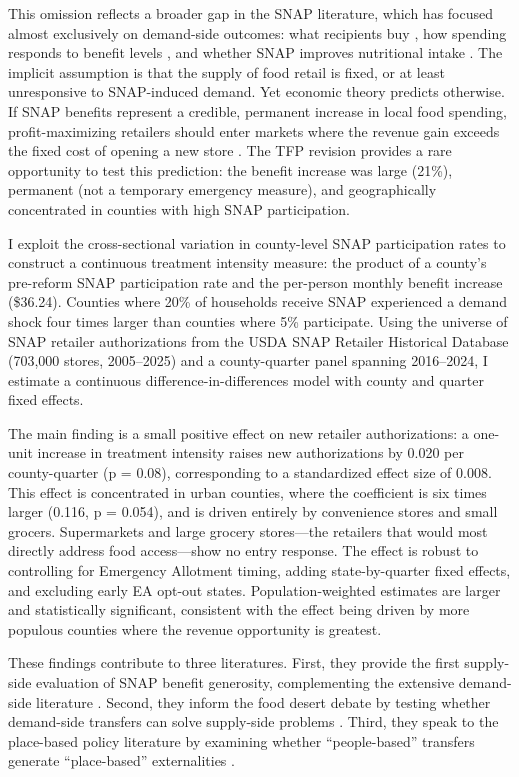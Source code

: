\documentclass[12pt]{article}
\begin{document}
This omission reflects a broader gap in the SNAP literature, which has focused almost exclusively on demand-side outcomes: what recipients buy \citep{hastings2019}, how spending responds to benefit levels \citep{east2023}, and whether SNAP improves nutritional intake \citep{hoynes2016}. The implicit assumption is that the supply of food retail is fixed, or at least unresponsive to SNAP-induced demand. Yet economic theory predicts otherwise. If SNAP benefits represent a credible, permanent increase in local food spending, profit-maximizing retailers should enter markets where the revenue gain exceeds the fixed cost of opening a new store \citep{allcott2019}. The TFP revision provides a rare opportunity to test this prediction: the benefit increase was large (21\%), permanent (not a temporary emergency measure), and geographically concentrated in counties with high SNAP participation.

I exploit the cross-sectional variation in county-level SNAP participation rates to construct a continuous treatment intensity measure: the product of a county's pre-reform SNAP participation rate and the per-person monthly benefit increase (\$36.24). Counties where 20\% of households receive SNAP experienced a demand shock four times larger than counties where 5\% participate. Using the universe of SNAP retailer authorizations from the USDA SNAP Retailer Historical Database (703,000 stores, 2005--2025) and a county-quarter panel spanning 2016--2024, I estimate a continuous difference-in-differences model with county and quarter fixed effects.

The main finding is a small positive effect on new retailer authorizations: a one-unit increase in treatment intensity raises new authorizations by 0.020 per county-quarter (p = 0.08), corresponding to a standardized effect size of 0.008. This effect is concentrated in urban counties, where the coefficient is six times larger (0.116, p = 0.054), and is driven entirely by convenience stores and small grocers. Supermarkets and large grocery stores---the retailers that would most directly address food access---show no entry response. The effect is robust to controlling for Emergency Allotment timing, adding state-by-quarter fixed effects, and excluding early EA opt-out states. Population-weighted estimates are larger and statistically significant, consistent with the effect being driven by more populous counties where the revenue opportunity is greatest.

These findings contribute to three literatures. First, they provide the first supply-side evaluation of SNAP benefit generosity, complementing the extensive demand-side literature \citep{hastings2019, hoynes2016, east2023}. Second, they inform the food desert debate by testing whether demand-side transfers can solve supply-side problems \citep{allcott2019, handbury2021, ver2018}. Third, they speak to the place-based policy literature by examining whether ``people-based'' transfers generate ``place-based'' externalities \citep{busso2013, kline2013, bartik1991}.
\end{document}
